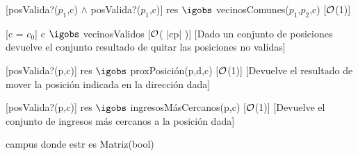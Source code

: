 \begin{Interfaz}
	[posValida?($p_1$,c) $\land$ posValida?($p_1$,c)]
	{res $\igobs$ vecinosComunes($p_1$,$p_2$,c)}
	[$\mathcal{O}$(1)]
	
	[c = $c_0$]
	{c $\igobs$ vecinosValidos}
	[$\mathcal{O}$( |cp| )]
	[Dado un conjunto de posiciones devuelve el conjunto resultado de quitar las posiciones no validas]
	
	[posValida?(p,c)]
	{res $\igobs$ proxPosición(p,d,c)}
	[$\mathcal{O}$(1)]
	[Devuelve el resultado de mover la posición indicada en la dirección dada]
		
	[posValida?(p,c)]
	{res $\igobs$ ingresosMásCercanos(p,c)}
	[$\mathcal{O}$(1)]
	[Devuelve el conjunto de ingresos más cercanos a la posición dada]
				
\end{Interfaz}

\begin{Representacion}

	
	\begin{Estructura}{campus}
	donde estr es Matriz(bool)
	\end{Estructura}
	
	
~	
	
	
    
\end{Representacion}